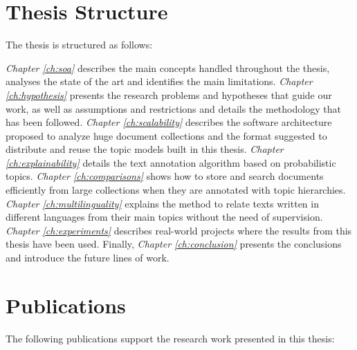 \section{Thesis Structure}

The thesis is structured as follows:

\textit{Chapter \ref{ch:soa}} describes the main concepts handled throughout the thesis, analyses the state of the art and identifies the main limitations. \textit{Chapter \ref{ch:hypothesis}} presents the research problems and hypotheses that guide our work, as well as assumptions and restrictions and details the methodology that has been followed. \textit{Chapter \ref{ch:scalability}} describes the software architecture proposed to analyze huge document collections and the format suggested to distribute and reuse the topic models built in this thesis. \textit{Chapter \ref{ch:explainability}} details the text annotation algorithm based on probabilistic topics. \textit{Chapter \ref{ch:comparisons}} shows how to store and search documents efficiently from large collections when they are annotated with topic hierarchies.  \textit{Chapter \ref{ch:multilinguality}} explains the method to relate texts written in different languages from their main topics without the need of supervision. \textit{Chapter \ref{ch:experiments}} describes real-world projects where the results from this thesis have been used. Finally, \textit{Chapter \ref{ch:conclusion}} presents the conclusions and introduce the future lines of work.


\section{Publications}

The following publications support the research work presented in this thesis:


